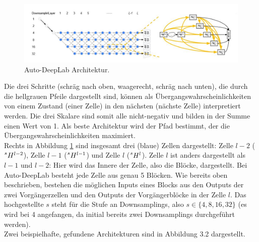 \begin{figure}[H]
	\centering
	\includegraphics[width=1\textwidth]{Pictures/AutoDeepLab/Autodeeplab1.jpg}
	\caption{Auto-DeepLab Architektur. \cite{autodeeplabPaper}}
	\label{pic:autodeeplab_Architektur}
\end{figure}

Die drei Schritte (schräg nach oben, waagerecht, schräg nach unten), die durch die hellgrauen Pfeile dargestellt sind, können als Übergangswahrscheinlichkeiten von einem Zustand (einer Zelle) in den nächsten (nächste Zelle) interpretiert werden. Die drei Skalare sind somit alle nicht-negativ und bilden in der Summe einen Wert von 1. Als beste Architektur wird der Pfad bestimmt, der die Übergangswahrscheinlichkeiten maximiert.\\[0.3cm]
Rechts in Abbildung \ref{pic:autodeeplab_Architektur} sind insgesamt drei (blaue) Zellen dargestellt: Zelle $l-2$ ($\prescript{s}{}{H}^{l-2}$), Zelle $l-1$ ($\prescript{s}{}{H}^{l-1}$) und Zelle $l$ ($\prescript{s}{}{H}^{l}$). Zelle $l$ ist anders dargestellt als $l-1$ und $l-2$: Hier wird das Innere der Zelle, also die Blöcke, dargestellt. Bei Auto-DeepLab besteht jede Zelle aus genau 5 Blöcken. Wie bereits oben beschrieben, bestehen die möglichen Inputs eines Blocks aus den Outputs der zwei Vorgängerzellen und den Outputs der Vorgängerblöcke in der Zelle $l$. Das hochgestellte $s$ steht für die Stufe an Downsamplings, also $s \in \{4,8,16,32\}$ (es wird bei 4 angefangen, da initial bereits zwei Downsamplings durchgeführt werden).\\[0.3cm]
Zwei beispielhafte, gefundene Architekturen sind in Abbildung 3.2 dargestellt.\\

